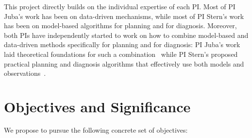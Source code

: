 \documentclass[12pt]{article}
\begin{document}
This project directly builds on the individual expertise of each PI. Most of PI Juba's work has been on data-driven mechanisms, while most of PI Stern's work has been on model-based algorithms for planning and for diagnosis. Moreover, both PIs have independently started to work on how to combine model-based and data-driven methods specifically for planning and for diagnosis: PI Juba's work laid theoretical foundations for such a combination~\cite{juba2016aaai,juba2016jmlr} while PI Stern's proposed practical planning and diagnosis algorithms that effectively use both models and observations~\cite{elmishali2016dataAugmented,stern2011probably,stern2012search}.

 
 

\section{Objectives and Significance}

We propose to pursue the following concrete set of objectives:

\vspace{-0.35cm}
\end{document}
